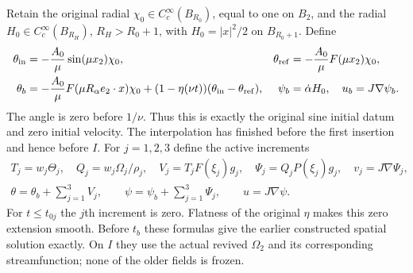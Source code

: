 Retain the original radial $\chi_0\in C_c^\infty(B_{R_0})$,
equal to one on $B_2$, and the radial
$H_0\in C_c^\infty(B_{R_H})$, $R_H>R_0+1$, with
$H_0=|x|^2/2$ on $B_{R_0+1}$. Define
\begin{align}\label{cvlane:tts:base}
 \theta_{\rm in}&=-\frac{A_0}{\mu}\sin(\mu x_2)\chi_0,
 &\theta_{\rm ref}&=-\frac{A_0}{\mu}F(\mu x_2)\chi_0,
 \nonumber\\
 \theta_b&=-\frac{A_0}{\mu}F(\mu R_\alpha e_2\cdot x)\chi_0
       +(1-\eta(\nu t))(\theta_{\rm in}-\theta_{\rm ref}),
 &\psi_b&=\dot\alpha H_0,\quad u_b=J\nabla\psi_b.
\end{align}
The angle is zero before $1/\nu$. Thus this is exactly the
original sine initial datum and zero initial velocity. The
interpolation has finished before the first insertion and hence
before $I$. For $j=1,2,3$ define the active increments
\begin{equation}\label{cvlane:tts:fields}
 \begin{gathered}
 T_j=w_j\Theta_j,\quad Q_j=w_j\Omega_j/\rho_j,\quad
 V_j=T_jF(\xi_j)g_j,\quad\Psi_j=Q_jP(\xi_j)g_j,\quad
 v_j=J\nabla\Psi_j,\\
 \theta=\theta_b+\sum_{j=1}^3V_j,\qquad
 \psi=\psi_b+\sum_{j=1}^3\Psi_j,\qquad u=J\nabla\psi.
 \end{gathered}
\end{equation}
For $t\leq t_{0j}$ the $j$th increment is zero. Flatness of the
original $\eta$ makes this zero extension smooth. Before $t_b$
these formulas give the earlier constructed spatial solution
exactly. On $I$ they use the actual revived $\Omega_2$ and its
corresponding streamfunction; none of the older fields is frozen.

